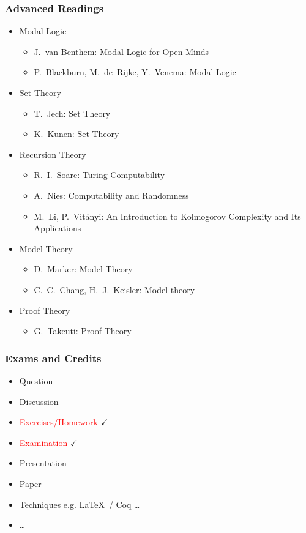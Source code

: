 \documentclass[UTF8,11pt,colorlinks,compress,openany]{beamer}%
\begin{document}
\begin{frame}\frametitle{Advanced Readings}
\begin{itemize}
	\item Modal Logic
		\begin{itemize}
			\item J.~van Benthem: Modal Logic for Open Minds
			\item P.~Blackburn, M.~de~Rijke, Y.~Venema: Modal Logic
		\end{itemize}
	\item Set Theory
		\begin{itemize}
			\item T.~Jech: Set Theory
			\item K.~Kunen: Set Theory
		\end{itemize}
	\item Recursion Theory
		\begin{itemize}
			\item R.~I.~Soare: Turing Computability
			\item A.~Nies: Computability and Randomness
			\item M.~Li, P.~Vit\'anyi: An Introduction to Kolmogorov Complexity and Its Applications
		\end{itemize}
	\item Model Theory
		\begin{itemize}
			\item D.~Marker: Model Theory
			\item C.~C.~Chang, H.~J.~Keisler: Model theory
		\end{itemize}
	\item Proof Theory
		\begin{itemize}
			\item G.~Takeuti: Proof Theory
		\end{itemize}
\end{itemize}
\end{frame}

\begin{frame}\frametitle{Exams and Credits}
	\begin{itemize}
		\item Question
		\item Discussion
		\item \textcolor{red}{Exercises/Homework} $\checkmark$
		\item \textcolor{red}{Examination} $\checkmark$
		\item Presentation
		\item Paper
		\item Techniques e.g. \LaTeX\, / Coq \dots
		\item \dots
	\end{itemize}
\end{frame}
\end{document}
